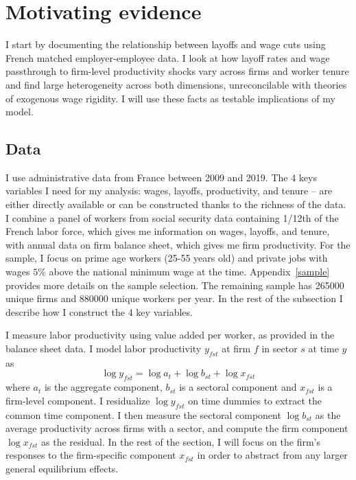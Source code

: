 \section{Motivating evidence}\label{sec:empirics}
I start by documenting the relationship between layoffs and wage cuts using French matched employer-employee data. I look at how layoff rates and wage passthrough to firm-level productivity shocks vary across firms and worker tenure and find large heterogeneity across both dimensions, unreconcilable with theories of exogenous wage rigidity. I will use these facts as testable implications of my model. 

\subsection{Data}
I use administrative data from France between 2009 and 2019. The 4 keys variables I need for my analysis: wages, layoffs, productivity, and tenure -- are either directly available or can be constructed thanks to the richness of the data. I combine a panel of workers from social security data containing 1/12th of the French labor force, which gives me information on wages, layoffs, and tenure, with annual data on firm balance sheet, which gives me firm productivity.  For the sample, I focus on prime age workers (25-55 years old) and private jobs with wages $5\%$ above the national minimum wage at the time. Appendix~\ref{sample} provides more details on the sample selection. The remaining sample has 265000 unique firms and 880000  unique workers per year. In the rest of the subsection I describe how I construct the 4 key variables.

I measure labor productivity using value added per worker, as provided in the balance sheet data. I model labor productivity $y_{fst}$ at firm $f$ in sector $s$ at time $y$ as 
\[ \log y_{fst} = \log a_t + \log b_{st}+ \log x_{fst}\]
where $a_t$ is the aggregate component, $b_{st}$ is a sectoral component and $x_{fst}$ is a firm-level component. I residualize $\log y_{fst}$ on time dummies to extract the common time component. I then measure the sectoral component $\log b_{st}$ as the average productivity across firms with a sector, and compute the firm component $\log x_{fst}$ as the residual. In the rest of the section, I will focus on the firm's responses to the firm-specific component $x_{fst}$ in order to abstract from any larger general equilibrium effects.

